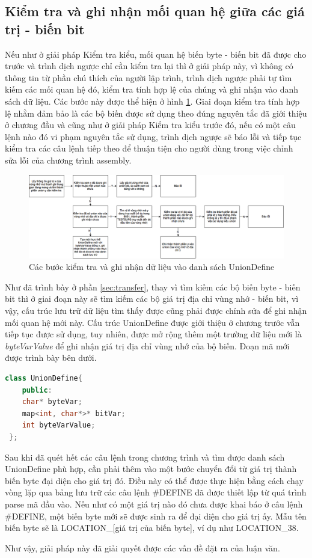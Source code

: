 \subsection{Kiểm tra và ghi nhận mối quan hệ giữa các giá trị - biến bit}
 Nếu như ở giải pháp Kiểm tra kiểu, mối quan hệ biến byte - biến bit đã được cho trước và trình dịch ngược chỉ cần kiểm tra lại thì ở giải pháp này, vì không có thông tin từ phần chú thích của người lập trình, trình dịch ngược phải tự tìm kiếm các mối quan hệ đó, kiểm tra tính hợp lệ của chúng và ghi nhận vào danh sách dữ liệu. Các bước này được thể hiện ở hình \ref{fig:stepunionmaking}. Giai đoạn kiểm tra tính hợp lệ nhằm đảm bảo là các bộ biến được sử dụng theo đúng nguyên tắc đã giới thiệu ở chương đầu và cũng như ở giải pháp Kiểm tra kiểu trước đó, nếu có một câu lệnh nào đó vi phạm nguyên tắc sử dụng, trình dịch ngược sẽ báo lỗi và tiếp tục kiểm tra các câu lệnh tiếp theo để thuận tiện cho người dùng trong việc chỉnh sửa lỗi của chương trình assembly.
\begin{figure}[h]
	\centering
	\includegraphics[width=0.7\linewidth]{image/stepUnionMaking}
	\caption{Các bước kiểm tra và ghi nhận dữ liệu vào danh sách UnionDefine}
	\label{fig:stepunionmaking}
\end{figure}

Như đã trình bày ở phần \ref{sec:transfer}, thay vì tìm kiếm các bộ biến byte - biến bit thì ở giai đoạn này sẽ tìm kiếm các bộ giá trị địa chỉ vùng nhớ - biến bit, vì vậy, cấu trúc lưu trữ dữ liệu tìm thấy được cũng phải được chỉnh sửa để ghi nhận mối quan hệ mới này. Cấu trúc UnionDefine được giới thiệu ở chương trước vẫn tiếp tục được sử dụng, tuy nhiên, được mở rộng thêm một trường dữ liệu mới là \textit{byteVarValue} để ghi nhận giá trị địa chỉ vùng nhớ của bộ biến. Đoạn mã mới được trình bày bên dưới.

\begin{lstlisting}[caption={Đoạn mã mới của class UnionDefine},label={list:listnewuniondefine},language=c++]
	class UnionDefine{
	public:
	char* byteVar;
	map<int, char*>* bitVar;
	int byteVarValue;
 };
\end{lstlisting}
Sau khi đã quét hết các câu lệnh trong chương trình và tìm được danh sách UnionDefine phù hợp, cần phải thêm vào một bước chuyển đổi từ giá trị thành biến byte đại diện cho giá trị đó. Điều này có thể được thực hiện bằng cách chạy vòng lặp qua bảng lưu trữ các câu lệnh \#DEFINE đã được thiết lập từ quá trình parse mã đầu vào. Nếu như có một giá trị nào đó chưa được khai báo ở câu lệnh \#DEFINE, một biến byte mới sẽ được sinh ra để đại diện cho giá trị ấy. Mẫu tên biến byte sẽ là LOCATION\_[giá trị của biến byte], ví dụ như LOCATION\_38.

Như vậy, giải pháp này đã giải quyết được các vấn đề đặt ra của luận văn. 